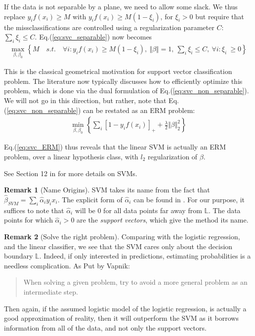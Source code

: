 \documentclass[12pt,a4paper]{article}
\theoremstyle{plain}
\theoremstyle{definition}
\newtheorem{remark}{Remark}
\newcommand{\norm}[1]{\Vert #1 \Vert}
\newcommand{\hyp}{f}
\newcommand{\plane}{\mathbb{L}}
\newcommand{\positive}[1]{\left[ #1 \right]_+}
\begin{document}
If the data is not separable by a plane, we need to allow some slack.
We thus replace $y_i \hyp(x_i) \geq M$ with $y_i \hyp(x_i) \geq M(1-\xi_i)$, for $\xi_i>0$ but require that the missclassifications are controlled using a regularization parameter $C$: $\sum_i \xi_i \leq C$.
Eq.(\ref{eq:svc_separable}) now becomes \citep[Eq.(12.25)]{hastie_elements_2003}
\begin{align}
\label{eq:svc_non_separable}
	\max_{\beta,\beta_0} \left\{ 
		M \quad s.t. \quad 
		\forall i: y_i \hyp(x_i) \geq M(1-\xi_i), 
		\: \norm{\beta}=1, 
		\: \sum_i \xi_i \leq C,
		\:\forall i:\xi_i\ \geq 0
	\right\}
\end{align}

This is the classical geometrical motivation for support vector classification problem.
The literature now typically discusses how to efficiently optimize this problem, which is done via the dual formulation of Eq.(\ref{eq:svc_non_separable}).
We will not go in this direction, but rather, note that Eq.(\ref{eq:svc_non_separable}) can be restated as an ERM problem:
\begin{align}
\label{eq:svc_ERM}
	\min_{\beta,\beta_0} \left\{
		\sum_i \positive{1-y_i \hyp(x_i)} +\frac{\lambda}{2} \norm{\beta}_2^2
	\right\}
\end{align}

Eq.(\ref{eq:svc_ERM}) thus reveals that the linear SVM is actually an ERM problem, over a linear hypothesis class, with $l_2$ regularization of $\beta$.

See Section 12 in \cite{hastie_elements_2003} for more details on SVMs.


\begin{remark}[Name Origins]
SVM takes its name from the fact that $\hat{\beta}_{SVM}=\sum_i \hat{\alpha}_i y_i x_i$.
The explicit form of $\hat{\alpha}_i$ can be found in \citep[Section 12.2.1]{hastie_elements_2003}.
For our purpose, it suffices to note that $\hat{\alpha}_i$ will be $0$ for all data points far away from $\plane$.
The data points for which $\hat{\alpha}_i>0$ are the \emph{support vectors}, which give the method its name.
\end{remark}





\begin{remark}[Solve the right problem]
Comparing with the logistic regression, and the linear classifier, we see that the SVM cares only about the decision boundary $\plane$. Indeed, if only interested in predictions, estimating probabilities is a needless complication. As Put by Vapnik: 
\begin{quote}
When solving a given problem, try to avoid a more general problem as an intermediate
step.
\end{quote}
Then again, if the assumed logistic model of the logistic regression, is actually a good approximation of reality, then it will outperform the SVM as it borrows information from all of the data, and not only the support vectors. 
\end{remark}
\end{document}
